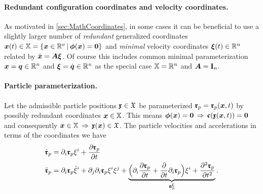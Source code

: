 \paragraph{Redundant configuration coordinates and velocity coordinates.} 
As motivated in \autoref{sec:MathCoordinates}, in some cases it can be beneficial to use a slightly larger number of \textit{redundant} generalized coordinates $\sysCoord(t) \in \configSpace = \{ \sysCoord \in \RealNum^{\numCoord} \, | \, \geoConstraint(\sysCoord) = \tuple{0} \}$ and \textit{minimal} velocity coordinates $\sysVel(t) \in \RealNum^{\dimConfigSpace}$ related by $\sysCoordd = \kinMat \sysVel$.
Of course this includes common minimal parameterization $\sysCoord = \genCoord \in \RealNum^{\dimConfigSpace}$ and $\sysVel=\genCoordd \in \RealNum^{\dimConfigSpace}$ as the special case $\configSpace=\RealNum^{\dimConfigSpace}$ and $\kinMat=\idMat[\dimConfigSpace]$.

\paragraph{Particle parameterization.}
Let the admissible particle positions $\particleCoord \in \particleConfigSpace$ be parameterized $\particlePos{\PidxI} = \particlePos{\PidxI}(\sysCoord, t)$ by possibly redundant coordinates $\sysCoord \in \configSpace$.
This means $\geoConstraint(\sysCoord) = \tuple{0}\,\Rightarrow\,\particleGeoConstraint(\particleCoord(\sysCoord,t)) = \tuple{0}$ and consequently $\sysCoord \in \configSpace \, \Rightarrow \, \particleCoord(\sysCoord) \in \particleConfigSpace$.
The particle velocities and accelerations in terms of the coordinates we have 
\begin{subequations}\label{eq:particleVelAcc}  
\begin{align}
 \particlePosd{\PidxI} &= \dirDiff{\LidxI}\particlePos{\PidxI} \sysVelCoeff{\LidxI} + \pdiff[\particlePos{\PidxI}]{t}
\\
 \particlePosdd{\PidxI} &= \dirDiff{\LidxI}\particlePos{\PidxI} \sysVelCoeffd{\LidxI} + \dirDiff{\LidxII}\dirDiff{\LidxI}\particlePos{\PidxI} \sysVelCoeff{\LidxI} \sysVelCoeff{\LidxII}
  + \underbrace{\Big( \dirDiff{\LidxI} \pdiff[\particlePos{\PidxI}]{t} + \pdiff{t}\dirDiff{i}\particlePos{\PidxI} \Big) \sysVelCoeff{\LidxI} + \frac{\partial^2 \particlePos{\PidxI}}{\partial t^2}}_{\particleAccTime{\PidxI}}.
\label{eq:particleAcc}
\end{align}
\end{subequations}

